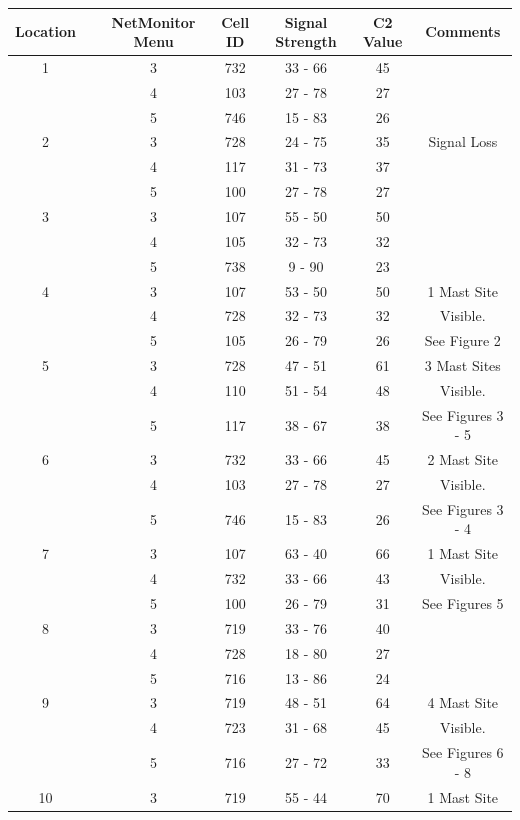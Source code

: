 \documentclass[a4paper,12pt]{article}
\begin{document}
\begin{tabular}{|c|c|c|c|c|c|c|}
\hline
Location	&	&	NetMonitor Menu	&	Cell ID	&	Signal Strength	& C2 Value	& Comments	\\
\hline
1	&		&	 3	&	732	&	33 - 66	&	45	&		\\
 	&		&	 4	&	103	&	27 - 78	&	27	&		\\
 	&		&	 5	&	746	&	15 - 83	&	26	&		\\
\hline	
2	&		&	 3	&	728	&	24 - 75	&	35	&	Signal Loss	\\
 	&		&	 4	&	117	&	31 - 73	&	37	&		\\
 	&		&	 5	&	100	&	27 - 78	&	27	&		\\
\hline	
3	&		&	 3	&	107	&	55 - 50	&	50	&		\\
 	&		&	 4	&	105	&	32 - 73	&	32	&		\\
 	&		&	 5	&	738	&	 9 - 90	&	23	&		\\
\hline	
4	&		&	 3	&	107	&	53 - 50	&	50	&	1 Mast Site \\
 	&		&	 4	&	728	&	32 - 73	&	32	&	Visible.		\\
 	&		&	 5	&	105	&	26 - 79	&	26	&	See Figure 2 \\
\hline	
5	&		&	 3	&	728	&	47 - 51	&	61	&	3 Mast Sites	\\
 	&		&	 4	&	110	&	51 - 54	&	48	&	Visible.	  		\\
 	&		&	 5	&	117	&	38 - 67	&	38	&	See Figures 3 - 5\\
\hline	
6	&		&	 3	&	732	&	33 - 66	&	45	&	2 Mast Site	\\
 	&		&	 4	&	103	&	27 - 78	&	27	&	Visible.	  	\\
 	&		&	 5	&	746	&	15 - 83	&	26	&	See Figures 3 - 4 \\
\hline	
7	&		&	 3	&	107	&	63 - 40	&	66	&	1 Mast Site	\\
 	&		&	 4	&	732	&	33 - 66	&	43	&	Visible.	  	\\
 	&		&	 5	&	100	&	26 - 79	&	31	&	See Figures 5	\\
\hline	
8	&		&	 3	&	719	&	33 - 76	&	40	&		\\
 	&		&	 4	&	728	&	18 - 80	&	27	&		\\
 	&		&	 5	&	716	&	13 - 86	&	24	&		\\
\hline	
9	&		&	 3	&	719	&	48 - 51	&	64	&	4 Mast Site	\\
 	&		&	 4	&	723	&	31 - 68	&	45	&	Visible.	  	\\
 	&		&	 5	&	716	&	27 - 72	&	33	&	See Figures 6 - 8	\\
\hline	
10	&		&	 3	&	719	&	55 - 44	&	70	&	1 Mast Site	\\

\end{tabular}
\end{document}
